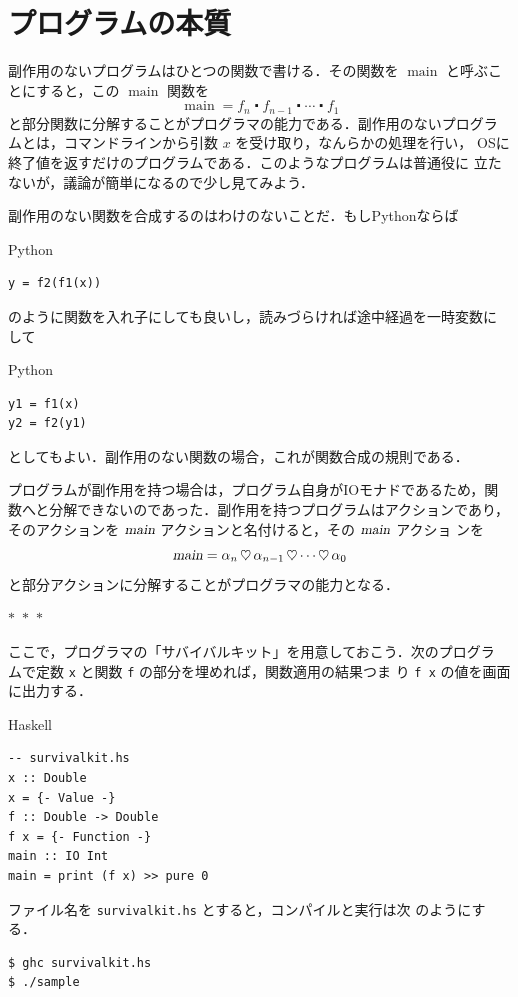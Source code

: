 \documentclass[a5paper,twoside,fleqn]{jsbook}
\newcommand{\separator}{\begin{center}$*$~$*$~$*$\end{center}}
\newcommand{\programminglanguage}[1]{\textsf{#1}}
\newcommand{\haskell}{\programminglanguage{Haskell}}
\newcommand{\python}{\programminglanguage{Python}}
\newcommand{\code}[1]{\texttt{#1}}
\newcommand{\filename}[1]{\texttt{#1}}
\newenvironment{haskellcode}{\begin{itembox}[r]{\haskell}}{\end{itembox}}
\newenvironment{pythoncode}{\begin{itembox}[r]{\python}}{\end{itembox}}
\newcommand{\mSpecialFunc}[1]{\mathrm{#1}}
\DeclareMathOperator{\mMainFunc}{\mSpecialFunc{main}}
\newcommand{\mAction}[1]{\textsl{#1}}
\DeclareMathOperator{\mMain}{\mAction{main}}
\DeclareMathOperator{\mBind}{\heartsuit}
\DeclareMathOperator{\mComp}{\centerdot}
\begin{document}
\section{プログラムの本質}

副作用のないプログラムはひとつの関数で書ける．その関数を $\mMainFunc$
と呼ぶことにすると，この $\mMainFunc$ 関数を
\begin{equation}
\mMainFunc=f_n\mComp f_{n-1}\mComp\dotsb\mComp f_1
\end{equation}
と部分関数に分解することがプログラマの能力である．副作用のないプログラ
ムとは，コマンドラインから引数 $x$ を受け取り，なんらかの処理を行い，
OSに終了値を返すだけのプログラムである．このようなプログラムは普通役に
立たないが，議論が簡単になるので少し見てみよう．

副作用のない関数を合成するのはわけのないことだ．もし\python ならば
\begin{pythoncode}
\begin{verbatim}
y = f2(f1(x))
\end{verbatim}
\end{pythoncode}
のように関数を入れ子にしても良いし，読みづらければ途中経過を一時変数に
して
\begin{pythoncode}
\begin{verbatim}
y1 = f1(x)
y2 = f2(y1)
\end{verbatim}
\end{pythoncode}
としてもよい．副作用のない関数の場合，これが関数合成の規則である．

プログラムが副作用を持つ場合は，プログラム自身がIOモナドであるため，関
数へと分解できないのであった．副作用を持つプログラムはアクションであり，
そのアクションを $\mMain$ アクションと名付けると，その $\mMain$ アクショ
ンを
\begin{equation}
\mMain=\alpha_n\mBind\alpha_{n-1}\mBind\dotsb\mBind\alpha_0
\end{equation}
と部分アクションに分解することがプログラマの能力となる．


\separator

ここで，プログラマの「サバイバルキット」を用意しておこう．次のプログラ
ムで定数 \code{x} と関数 \code{f} の部分を埋めれば，関数適用の結果つま
り \code{f x} の値を画面に出力する．
\begin{haskellcode}
\begin{verbatim}
-- survivalkit.hs
x :: Double
x = {- Value -}
f :: Double -> Double
f x = {- Function -}
main :: IO Int
main = print (f x) >> pure 0
\end{verbatim}
\end{haskellcode}
ファイル名を \filename{survivalkit.hs} とすると，コンパイルと実行は次
のようにする．
\begin{verbatim}
$ ghc survivalkit.hs
$ ./sample
\end{verbatim}%
\end{document}
